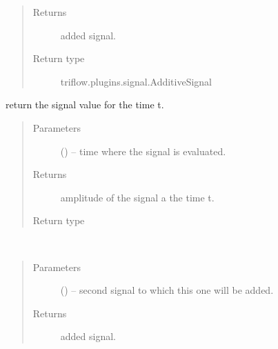 \documentclass[letterpaper,10pt,english]{sphinxmanual}
\begin{document}
\begin{fulllineitems}
\begin{fulllineitems}
\begin{quote}
\begin{description}
\item[{Returns}] \leavevmode
added signal.

\item[{Return type}] \leavevmode
triflow.plugins.signal.AdditiveSignal

\end{description}\end{quote}

\end{fulllineitems}


\begin{fulllineitems}
\label{\detokenize{triflow.plugins:triflow.plugins.signals.Signal.__call__}}
return the signal value for the time t.
\begin{quote}\begin{description}
\item[{Parameters}] \leavevmode
{} () -- time where the signal is evaluated.

\item[{Returns}] \leavevmode
amplitude of the signal a the time t.

\item[{Return type}] \leavevmode
{}

\end{description}\end{quote}

\end{fulllineitems}


\begin{fulllineitems}
\label{\detokenize{triflow.plugins:triflow.plugins.signals.Signal.__sub__}}~\begin{quote}\begin{description}
\item[{Parameters}] \leavevmode
{} () -- second signal to which this one will be added.

\item[{Returns}] \leavevmode
added signal.


\end{description}
\end{quote}
\end{fulllineitems}
\end{fulllineitems}
\end{document}
